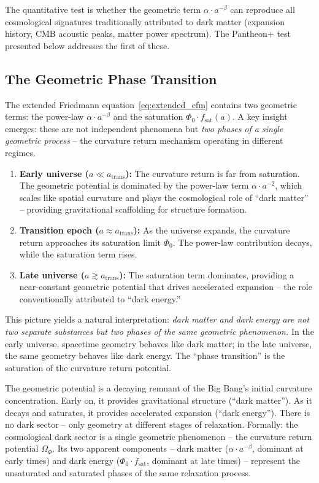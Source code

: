 \documentclass[aps,prd,twocolumn,superscriptaddress,nofootinbib]{revtex4-2}
\begin{document}
The quantitative test is whether the geometric term $\alpha \cdot a^{-\beta}$ can reproduce all cosmological signatures traditionally attributed to dark matter (expansion history, CMB acoustic peaks, matter power spectrum). The Pantheon+ test presented below addresses the first of these.

\subsection{The Geometric Phase Transition}
\label{subsec:phase_transition}

The extended Friedmann equation~\eqref{eq:extended_cfm} contains two geometric terms: the power-law $\alpha \cdot a^{-\beta}$ and the saturation $\Phi_0 \cdot f_{\mathrm{sat}}(a)$. A key insight emerges: these are not independent phenomena but \textit{two phases of a single geometric process} -- the curvature return mechanism operating in different regimes.

\begin{enumerate}
\item \textbf{Early universe ($a \ll a_{\mathrm{trans}}$):} The curvature return is far from saturation. The geometric potential is dominated by the power-law term $\alpha \cdot a^{-2}$, which scales like spatial curvature and plays the cosmological role of ``dark matter'' -- providing gravitational scaffolding for structure formation.

\item \textbf{Transition epoch ($a \approx a_{\mathrm{trans}}$):} As the universe expands, the curvature return approaches its saturation limit $\Phi_0$. The power-law contribution decays, while the saturation term rises.

\item \textbf{Late universe ($a \gtrsim a_{\mathrm{trans}}$):} The saturation term dominates, providing a near-constant geometric potential that drives accelerated expansion -- the role conventionally attributed to ``dark energy.''
\end{enumerate}

This picture yields a natural interpretation: \textit{dark matter and dark energy are not two separate substances but two phases of the same geometric phenomenon.} In the early universe, spacetime geometry behaves like dark matter; in the late universe, the same geometry behaves like dark energy. The ``phase transition'' is the saturation of the curvature return potential.

The geometric potential is a decaying remnant of the Big Bang's initial curvature concentration. Early on, it provides gravitational structure (``dark matter''). As it decays and saturates, it provides accelerated expansion (``dark energy''). There is no dark sector -- only geometry at different stages of relaxation. Formally: the cosmological dark sector is a single geometric phenomenon -- the curvature return potential $\Omega_\Phi$. Its two apparent components -- dark matter ($\alpha \cdot a^{-\beta}$, dominant at early times) and dark energy ($\Phi_0 \cdot f_{\mathrm{sat}}$, dominant at late times) -- represent the unsaturated and saturated phases of the same relaxation process.
\end{document}
